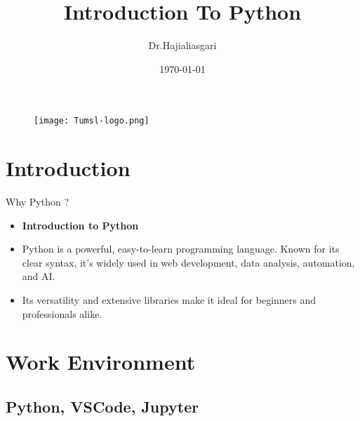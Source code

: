 \documentclass[serif, aspectratio=169]{beamer}
\author{Dr.Hajialiasgari}
\title{Introduction To Python}
\institute{
    Tehran University \\
    Of\\
    Medical Science
}
\date{\small \today}
\begin{document}
\begin{frame}
    \titlepage
    \vspace*{-0.6cm}
    \begin{figure}[htpb]
        \begin{center}
            \texttt{[image: Tumsl-logo.png]}
        \end{center}
    \end{figure}
\end{frame}

\begin{frame}    
\tableofcontents[sectionstyle=show,
subsectionstyle=show/shaded/hide,
subsubsectionstyle=show/shaded/hide]
\end{frame}

\section{Introduction}

\begin{frame}{Why Python ?}
    \begin{itemize}[<+-| alert@+>] %
        \item \textbf{Introduction to Python}
        \item Python is a powerful, easy-to-learn programming language. Known for its clear syntax, it’s widely used in web development, data analysis, automation, and AI.
        \item Its versatility and extensive libraries make it ideal for beginners and professionals alike.
    \end{itemize}
\end{frame}


\section{Work Environment}
\subsection{Python, VSCode, Jupyter}
\end{document}
